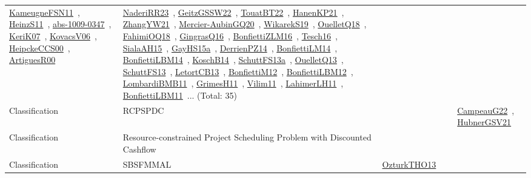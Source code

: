 {\begin{longtable}{lp{3cm}>{\raggedright\arraybackslash}p{6cm}>{\raggedright\arraybackslash}p{6cm}>{\raggedright\arraybackslash}p{8cm}}
\href{works/KameugneFSN11.pdf}{KameugneFSN11}~\cite{KameugneFSN11}, \href{works/HeinzS11.pdf}{HeinzS11}~\cite{HeinzS11}, \href{works/abs-1009-0347.pdf}{abs-1009-0347}~\cite{abs-1009-0347}, \href{works/KeriK07.pdf}{KeriK07}~\cite{KeriK07}, \href{works/KovacsV06.pdf}{KovacsV06}~\cite{KovacsV06}, \href{works/HeipckeCCS00.pdf}{HeipckeCCS00}~\cite{HeipckeCCS00}, \href{works/ArtiguesR00.pdf}{ArtiguesR00}~\cite{ArtiguesR00} & \href{works/NaderiRR23.pdf}{NaderiRR23}~\cite{NaderiRR23}, \href{works/GeitzGSSW22.pdf}{GeitzGSSW22}~\cite{GeitzGSSW22}, \href{works/TouatBT22.pdf}{TouatBT22}~\cite{TouatBT22}, \href{works/HanenKP21.pdf}{HanenKP21}~\cite{HanenKP21}, \href{works/ZhangYW21.pdf}{ZhangYW21}~\cite{ZhangYW21}, \href{works/Mercier-AubinGQ20.pdf}{Mercier-AubinGQ20}~\cite{Mercier-AubinGQ20}, \href{works/WikarekS19.pdf}{WikarekS19}~\cite{WikarekS19}, \href{works/OuelletQ18.pdf}{OuelletQ18}~\cite{OuelletQ18}, \href{works/FahimiOQ18.pdf}{FahimiOQ18}~\cite{FahimiOQ18}, \href{works/GingrasQ16.pdf}{GingrasQ16}~\cite{GingrasQ16}, \href{works/BonfiettiZLM16.pdf}{BonfiettiZLM16}~\cite{BonfiettiZLM16}, \href{works/Tesch16.pdf}{Tesch16}~\cite{Tesch16}, \href{works/SialaAH15.pdf}{SialaAH15}~\cite{SialaAH15}, \href{works/GayHS15a.pdf}{GayHS15a}~\cite{GayHS15a}, \href{works/DerrienPZ14.pdf}{DerrienPZ14}~\cite{DerrienPZ14}, \href{works/BonfiettiLM14.pdf}{BonfiettiLM14}~\cite{BonfiettiLM14}, \href{works/BonfiettiLBM14.pdf}{BonfiettiLBM14}~\cite{BonfiettiLBM14}, \href{works/KoschB14.pdf}{KoschB14}~\cite{KoschB14}, \href{works/SchuttFS13a.pdf}{SchuttFS13a}~\cite{SchuttFS13a}, \href{works/OuelletQ13.pdf}{OuelletQ13}~\cite{OuelletQ13}, \href{works/SchuttFS13.pdf}{SchuttFS13}~\cite{SchuttFS13}, \href{works/LetortCB13.pdf}{LetortCB13}~\cite{LetortCB13}, \href{works/BonfiettiM12.pdf}{BonfiettiM12}~\cite{BonfiettiM12}, \href{works/BonfiettiLBM12.pdf}{BonfiettiLBM12}~\cite{BonfiettiLBM12}, \href{works/LombardiBMB11.pdf}{LombardiBMB11}~\cite{LombardiBMB11}, \href{works/GrimesH11.pdf}{GrimesH11}~\cite{GrimesH11}, \href{works/Vilim11.pdf}{Vilim11}~\cite{Vilim11}, \href{works/LahimerLH11.pdf}{LahimerLH11}~\cite{LahimerLH11}, \href{works/BonfiettiLBM11.pdf}{BonfiettiLBM11}~\cite{BonfiettiLBM11}... (Total: 35)\\
Classification & RCPSPDC &  &  & \href{works/CampeauG22.pdf}{CampeauG22}~\cite{CampeauG22}, \href{works/HubnerGSV21.pdf}{HubnerGSV21}~\cite{HubnerGSV21}\\
Classification & Resource-constrained Project Scheduling Problem with Discounted Cashflow &  &  & \\
Classification & SBSFMMAL & \href{works/OzturkTHO13.pdf}{OzturkTHO13}~\cite{OzturkTHO13} &  & \\

\end{longtable}}
